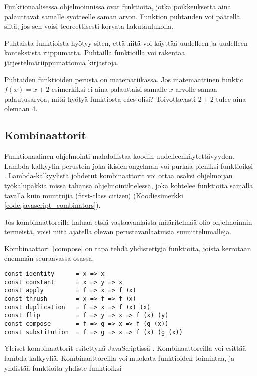 Funktionaalisessa ohjelmoinnissa  ovat funktioita, jotka poikkeuksetta aina palauttavat samalle syötteelle saman arvon. Funktion puhtauden voi päätellä siitä, jos sen voisi teoreettisesti korvata hakutaulukolla. \citep{feldman_fp_pragmatists}

Puhtaista funktioista hyötyy siten, että niitä voi käyttää uudelleen ja uudelleen kontekstista riippumatta. Puhtailla funktioilla voi rakentaa järjestelmäriippumattomia kirjastoja.

Puhtaiden funktioiden perusta on matematiikassa. Jos matemaattinen funktio $f(x) = x+2$ esimerkiksi ei aina palauttaisi samalle $x$ arvolle samaa palautusarvoa, mitä hyötyä funktiosta edes olisi? Toivottavasti $2 + 2$ tulee aina olemaan $4$.

\subsection{Kombinaattorit}

Funktionaalinen ohjelmointi mahdollistaa koodin uudelleenkäytettävyyden. Lambda-kalkyylin perustein joka ikisien ongelman voi purkaa pieniksi funktioiksi \cite{BlellochHarper2015}. Lambda-kalkyylistä johdetut kombinaattorit voi ottaa osaksi ohjelmoijan työkalupakkia missä tahansa ohjelmointikielessä, joka kohtelee funktioita samalla tavalla kuin muuttujia (first-class citizen) (Koodiesimerkki \ref{code:javascript_combinators}).

Jos kombinaattoreille haluaa etsiä vastaavanlaista määritelmää olio-ohjelmoinnin termeistä, voisi niitä ajatella olevan perustavanlaatuisia suunittelumalleja.

Kombinaattori \texttt|compose| on tapa tehdä yhdistettyjä funktioita, joista kerrotaan enemmän seuraavassa osassa.

\begin{code}
    \begin{verbatim}
const identity      = x => x
const constant      = x => y => x
const apply         = f => x => f (x)
const thrush        = x => f => f (x)
const duplication   = f => x => f (x) (x)
const flip          = f => y => x => f (x) (y)
const compose       = f => g => x => f (g (x)) 
const substitution  = f => g => x => f (x) (g (x))
\end{verbatim}
    \caption{Yleiset kombinaattorit esitettynä JavaScriptissä \cite{javascript_combinators}. Kombinaattoreilla voi esittää lambda-kalkyyliä. Kombinaattoreilla voi muokata funktioiden toimintaa, ja yhdistää funktioita yhdiste funktioiksi}
    \label{code:javascript_combinators}
\end{code}

